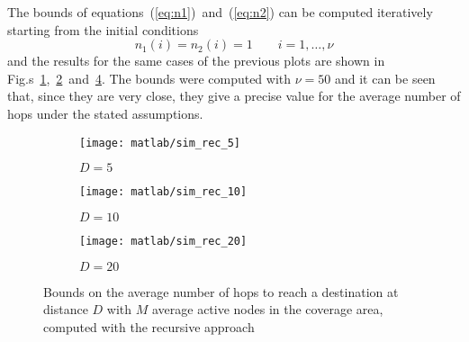 \documentclass[a4paper,oneside]{article}
\begin{document}
  The bounds of equations~(\ref{eq:n1})~and~(\ref{eq:n2}) can be
  computed iteratively starting from the initial conditions
  \begin{equation}
    n_1(i) = n_2(i) = 1 \qquad i = 1, \dots, \nu 
  \end{equation}
  and the results for the same cases of the previous plots are shown
  in
  Fig.s~\ref{plot:geraf_rec_5},~\ref{plot:geraf_rec_10}~and~\ref{plot:geraf_rec_20}. The
  bounds were computed with $\nu = 50$ and it can be seen that, since
  they are very close, they give a precise value for the average
  number of hops under the stated assumptions.
\begin{figure}[htbp]
  \centering
  \begin{subfigure}{0.5\textwidth}
    \centering
    \texttt{[image: matlab/sim\_rec\_5]}
    \caption{$ D = 5 $}
    \label{plot:geraf_rec_5}
  \end{subfigure}%
  \begin{subfigure}{0.5\textwidth}
    \centering
    \texttt{[image: matlab/sim\_rec\_10]}
    \caption{$ D = 10 $}
    \label{plot:geraf_rec_10}
  \end{subfigure}
  \begin{subfigure}{0.5\textwidth}
    \centering
    \texttt{[image: matlab/sim\_rec\_20]}
    \caption{$ D = 20 $}
    \label{plot:geraf_rec_20}
  \end{subfigure}
  \caption{Bounds on the average number of hops to reach a destination
    at distance $D$ with $M$ average active nodes in the coverage
    area, computed with the recursive approach}
\end{figure}
\end{document}
